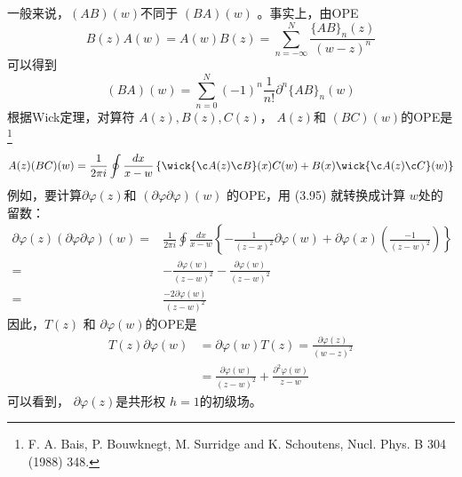 一般来说，$ (AB)(w) $不同于 $(BA)(w)$ 。事实上，由OPE
\begin{equation}
	B(z) A(w)=A(w) B(z)=\sum_{n=-\infty}^{N} \frac{\{A B\}_{n}(z)}{(w-z)^{n}}
\end{equation}
可以得到
\begin{equation}
	(B A)(w)=\sum_{n=0}^{N}(-1)^{n} \frac{1}{n !} \partial^{n}\{A B\}_{n}(w)
\end{equation}
根据Wick定理，对算符 $A(z),B(z),C(z) $， $A(z) $和 $(BC)(w) $的OPE是\footnote{F. A. Bais, P. Bouwknegt, M. Surridge and K. Schoutens, Nucl. Phys. B 304 (1988) 348.}
\begin{equation}
	A(z)(B C)(w)=\frac{1}{2 \pi i} \oint \frac{d x}{x-w}\left\{ \wick{\c A(z) \c B}(x) C(w)+B(x) \wick{\c A(z) \c C}(w)\right\}
\end{equation}
例如，要计算$ \partial \varphi(z) $和 $(\partial \varphi \partial \varphi)(w)$ 的OPE，用 (3.95) 就转换成计算 $w $处的留数：
\begin{equation}
	\begin{aligned} \partial \varphi(z)(\partial \varphi \partial \varphi)(w)=& \frac{1}{2 \pi i} \oint \frac{d x}{x-w}\left\{-\frac{1}{(z-x)^{2}} \partial \varphi(w)+\partial \varphi(x)\left(\frac{-1}{(z-w)^{2}}\right)\right\} \\ =&-\frac{\partial \varphi(w)}{(z-w)^{2}}-\frac{\partial \varphi(w)}{(z-w)^{2}} \\ =& \frac{-2 \partial \varphi(w)}{(z-w)^{2}} \end{aligned}
\end{equation}
因此，$ T(z)$ 和 $\partial\varphi(w) $的OPE是
\begin{equation}
	\begin{aligned} T(z) \partial \varphi(w) &=\partial \varphi(w) T(z)=\frac{\partial \varphi(z)}{(w-z)^{2}} \\ &=\frac{\partial \varphi(w)}{(z-w)^{2}}+\frac{\partial^{2} \varphi(w)}{z-w} \end{aligned}
\end{equation}
可以看到， $\partial \varphi(z) $是共形权 $h=1 $的初级场。

